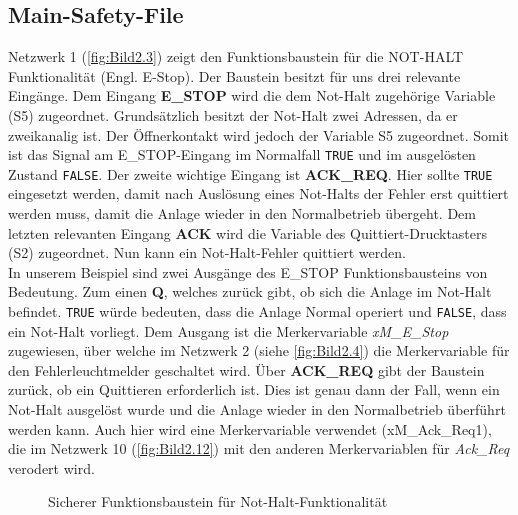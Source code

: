 \renewcommand{\arraystretch}{1}

\clearpage
\subsection{Main-Safety-File} \label{sec:main-safety}

Netzwerk 1 (\autoref{fig:Bild2.3}) zeigt den Funktionsbaustein für die NOT-HALT Funktionalität (Engl.\xspace E-Stop). Der Baustein besitzt für uns drei relevante Eingänge. Dem Eingang \textbf{E\_STOP} wird die dem Not-Halt zugehörige Variable (S5) zugeordnet. Grundsätzlich besitzt der Not-Halt zwei Adressen, da er zweikanalig ist. Der Öffnerkontakt wird jedoch der Variable S5 zugeordnet. Somit ist das Signal am E\_STOP-Eingang im Normalfall \texttt{TRUE} und im ausgelösten Zustand \texttt{FALSE}. Der zweite wichtige Eingang ist \textbf{ACK_REQ}. Hier sollte \texttt{TRUE} eingesetzt werden, damit nach Auslösung eines Not-Halts der Fehler erst quittiert werden muss, damit die Anlage wieder in den Normalbetrieb übergeht. Dem letzten relevanten Eingang \textbf{ACK} wird die Variable des Quittiert-Drucktasters (S2) zugeordnet. Nun kann ein Not-Halt-Fehler quittiert werden. \\
In unserem Beispiel sind zwei Ausgänge des E\_STOP Funktionsbausteins von Bedeutung. Zum einen \textbf{Q}, welches zurück gibt, ob sich die Anlage im Not-Halt befindet. \texttt{TRUE} würde bedeuten, dass die Anlage Normal operiert und \texttt{FALSE}, dass ein Not-Halt vorliegt. Dem Ausgang ist die Merkervariable \textit{xM\_E\_Stop} zugewiesen, über welche im Netzwerk 2 (siehe \autoref{fig:Bild2.4}) die Merkervariable für den Fehlerleuchtmelder geschaltet wird. Über \textbf{ACK_REQ} gibt der Baustein zurück, ob ein Quittieren erforderlich ist. Dies ist genau dann der Fall, wenn ein Not-Halt ausgelöst wurde und die Anlage wieder in den Normalbetrieb überführt werden kann. Auch hier wird eine Merkervariable verwendet (xM\_Ack\_Req1), die im Netzwerk 10 (\autoref{fig:Bild2.12}) mit den anderen Merkervariablen für \textit{Ack\_Req} verodert wird.

\begin{figure}[H]
   \centering
   \caption[Not-Halt FB]{Sicherer Funktionsbaustein für Not-Halt-Funktionalität}
   \label{fig:Bild2.3}
\end{figure}

